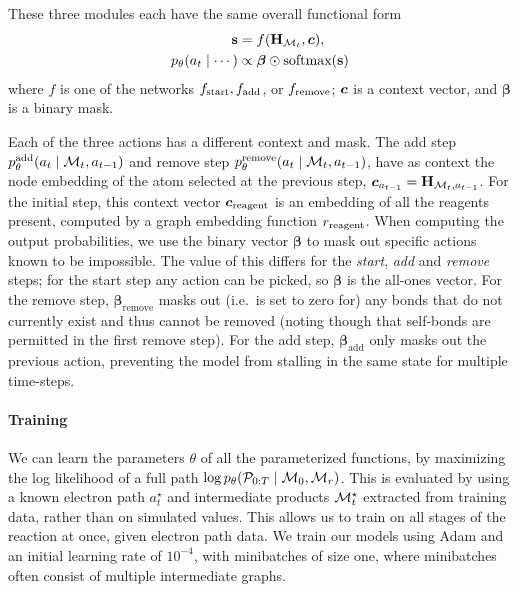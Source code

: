 These three modules each have the same overall functional form
\begin{align}
\textbf{s} &= f({\mathbf{H}}_{{\mathcal{M}}_t}, \bm{c}), \\
p_\theta(a_t \mid \cdots) &\propto \bm{\beta} \odot \mbox{softmax}(\bm{\textbf{s}})
\end{align}
where $f$ is one of the networks $f_{\textrm{start}}, f_{\textrm{add}}$, or $f_{\textrm{remove}}$; 
$\bm{c}$ is a context vector, and $\bm{\beta}$ is a binary mask.

Each of the three actions has a different context and mask.
The add step $p_\theta^\textrm{add}(a_t \mid {\mathcal{M}}_t, a_{t-1})$ and remove step $p_\theta^\textrm{remove}(a_t \mid {\mathcal{M}}_t, a_{t-1})$,
 have as context the node embedding of the atom selected at the previous step, $\bm{c}_{a_{t-1}} = {\mathbf{H}}_{{\mathcal{M}}_t, a_{t-1}}$. 
For the initial step, this context vector $\bm{c}_\mathrm{reagent}$ is an embedding of all the reagents present, computed 
by a graph embedding function $r_\mathrm{reagent}$.
When computing the output probabilities,
we use the binary vector $\bm{\beta}$ to mask out specific actions known to be impossible.
The value of this differs for the {\em start}, {\em add} and {\em remove} steps;
for the start step any action can be picked, so $\bm{\beta}$ is the all-ones vector.
For the remove step, $\bm{\beta}_\mathrm{remove}$ masks out (i.e.\ is set to zero for) any bonds that do not currently exist and thus cannot be removed (noting though that self-bonds are permitted in the first remove step).
For the add step, $\bm{\beta}_\textrm{add}$ only masks out the previous action, preventing the model from stalling in the same state for multiple time-steps. 
\paragraph{Training}
We can learn the parameters $\theta$ of all the parameterized functions, by maximizing the log likelihood of a full path $\log p_\theta({\mathcal{P}}_{0:T} \mid {\mathcal{M}}_0, {\mathcal{M}}_r)$.
This is evaluated by using a known electron path $a_t^\star$ and intermediate products ${\mathcal{M}}_t^\star$ extracted from training data,
rather than on simulated values. 
This allows us to train on all stages of the reaction at once, given electron path data.
We train our models using Adam \citep{kingma2014adam} and an initial learning rate of $10^{-4}$,
with minibatches of size one, where minibatches often consist of multiple intermediate graphs.

